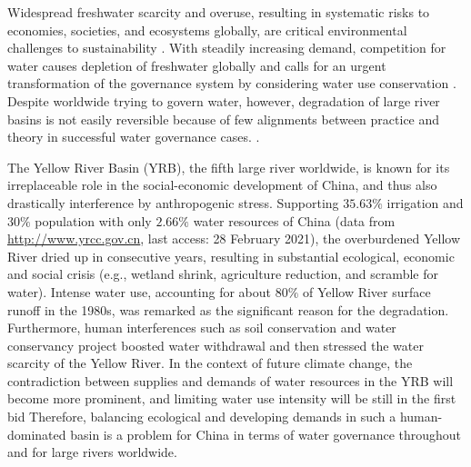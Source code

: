 Widespread freshwater scarcity and overuse, resulting in systematic risks to economies, societies, and ecosystems globally, are critical environmental challenges to sustainability \cite{distefano2017, dolan2021, xu2020b, mekonnen2016}.
With steadily increasing demand, competition for water causes depletion of freshwater globally and calls for an urgent transformation of the governance system by considering water use conservation \cite{gleick2010, ziolkowska2016, wang2019d}.
Despite worldwide trying to govern water, however, degradation of large river basins is not easily reversible because of few alignments between practice and theory in successful water governance cases.
\cite{giuliani2013, falkenmark2019, jaeger2019}.

The Yellow River Basin (YRB), the fifth large river worldwide, is known for its irreplaceable role in the social-economic development of China, and thus also drastically interference by anthropogenic stress.
Supporting $35.63\%$ irrigation and $30\%$ population with only $2.66\%$ water resources of China (data from \href{http://www.yrcc.gov.cn}{http://www.yrcc.gov.cn}, last access: 28 February 2021), the overburdened Yellow River dried up in consecutive years, resulting in substantial ecological, economic and social crisis (e.g., wetland shrink, agriculture reduction, and scramble for water).
Intense water use, accounting for about $80\%$ of Yellow River surface runoff in the 1980s, was remarked as the significant reason for the degradation.
Furthermore, human interferences such as soil conservation and water conservancy project boosted water withdrawal and then stressed the water scarcity of the Yellow River.
In the context of future climate change, the contradiction between supplies and demands of water resources in the YRB will become more prominent, and limiting water use intensity will be still in the first bid
Therefore, balancing ecological and developing demands in such a human-dominated basin is a problem for China in terms of water governance throughout and for large rivers worldwide.

